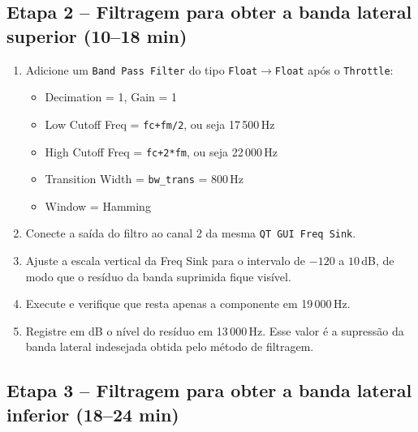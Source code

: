 \documentclass[11pt,a4paper]{article}
\begin{document}
\subsection*{Etapa 2 -- Filtragem para obter a banda lateral superior (10--18 min)}

\begin{instrucao}
\begin{enumerate}[label=\arabic*.]
  \item Adicione um \texttt{Band Pass Filter} do tipo \texttt{Float$\to$Float}
    após o \texttt{Throttle}:
    \begin{itemize}
      \item Decimation = 1, Gain = 1
      \item Low Cutoff Freq = \texttt{fc+fm/2}, ou seja 17\,500\,Hz
      \item High Cutoff Freq = \texttt{fc+2*fm}, ou seja 22\,000\,Hz
      \item Transition Width = \texttt{bw\_trans} = 800\,Hz
      \item Window = Hamming
    \end{itemize}
  \item Conecte a saída do filtro ao canal 2 da mesma \texttt{QT GUI Freq Sink}.
  \item Ajuste a escala vertical da Freq Sink para o intervalo de $-120$ a
    $10$\,dB, de modo que o resíduo da banda suprimida fique visível.
  \item Execute e verifique que resta apenas a componente em 19\,000\,Hz.
  \item Registre em dB o nível do resíduo em 13\,000\,Hz. Esse valor é a
    supressão da banda lateral indesejada obtida pelo método de filtragem.
\end{enumerate}
\end{instrucao}

\subsection*{Etapa 3 -- Filtragem para obter a banda lateral inferior (18--24 min)}
\end{document}
